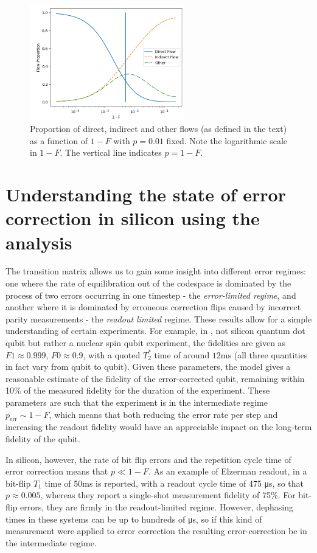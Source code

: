 \documentclass{report}
\begin{document}
\begin{figure}[ht]
        \centering
        \includegraphics[width=0.6\textwidth]{Figures/flow/p_fixed.png} %
        \caption{Proportion of direct, indirect and other flows (as defined in the text) as a function of $1-F$ with $p = 0.01$ fixed. Note the logarithmic scale in $1-F$. The vertical line indicates $p = 1-F$.}
        \label{fig:flowprop2}
\end{figure}

\section{Understanding the state of error correction in silicon using the analysis}
The transition matrix allows us to gain some insight into different error regimes: one where the rate of equilibration out of the codespace is dominated by the process of two errors occurring in one timestep - the \textit{error-limited regime}, and another where it is dominated by erroneous correction flips caused by incorrect parity measurements - the \textit{readout limited} regime.  These results allow for a simple understanding of certain experiments. For example, in \cite{Cramer2016}, not silicon quantum dot qubit but rather a nuclear spin qubit experiment, the fidelities are given as $F1\approx0.999$, $F0\approx0.9$, with a quoted $T_2^*$ time of around $12\unit{\milli\second}$ (all three quantities in fact vary from qubit to qubit). Given these parameters, the model gives a reasonable estimate of the fidelity of the error-corrected qubit, remaining within 10\% of the measured fidelity for the duration of the experiment. These parameters are such that the experiment is in the intermediate regime $p_{\text{err}}\sim 1-F$, which means that both reducing the error rate per step and increasing the readout fidelity would have an appreciable impact on the long-term fidelity of the qubit. 

In silicon, however, the rate of bit flip errors and the repetition cycle time of error correction means that $p \ll 1-F$. As an example of Elzerman readout, in \cite{Xue2020} a bit-flip $T_1$ time of 50\unit{\milli \second} is reported, with a readout cycle time of 475 \unit{\micro\second}, so that $p \approx 0.005$, whereas they report a single-shot measurement fidelity of 75\%. For bit-flip errors, they are firmly in the readout-limited regime. However, dephasing times in these systems can be up to hundreds of \unit{\micro\second}, so if this kind of measurement were applied to error correction the resulting error-correction be in the intermediate regime.
\end{document}
